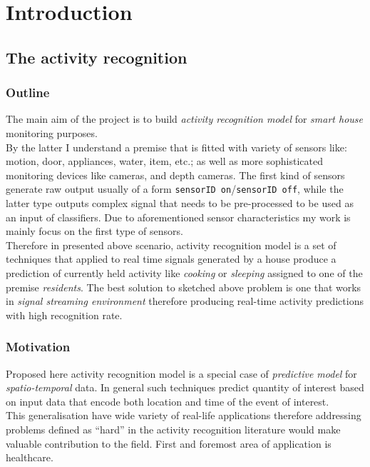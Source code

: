 \documentclass[12pt, a4paper, pdflatex, leqno, twoside, openright]{report}
\begin{document}
\chapter{Introduction\label{ch:introduction}} %
\setcounter{page}{1}

  \section{The activity recognition}
    \subsection{Outline} %
The main aim of the project is to build \emph{activity recognition model} for \emph{smart house} monitoring purposes.\\
By the latter I understand a premise that is fitted with variety of sensors like: motion, door, appliances, water, item, etc.; as well as more sophisticated monitoring devices like cameras, and depth cameras. The first kind of sensors generate raw output usually of a form \texttt{sensorID on}/\texttt{sensorID off}, while the latter type outputs complex signal that needs to be pre-processed to be used as an input of classifiers. Due to aforementioned sensor characteristics my work is mainly focus on the first type of sensors.\\
Therefore in presented above scenario, activity recognition model is a set of techniques that applied to real time signals generated by a house produce a prediction of currently held activity like \emph{cooking} or \emph{sleeping} assigned to one of the premise \emph{residents}. The best solution to sketched above problem is one that works in \emph{signal streaming environment} therefore producing real-time activity predictions with high recognition rate.

    \subsection{Motivation\label{sec:applications}} %
Proposed here activity recognition model is a special case of \emph{predictive model} for \emph{spatio-temporal} data. In general such techniques predict quantity of interest based on input data that encode both location and time of the event of interest.\\
This generalisation have wide variety of real-life applications therefore addressing problems defined as ``hard'' in the activity recognition literature would make valuable contribution to the field. 
First and foremost area of application is healthcare.
\end{document}
